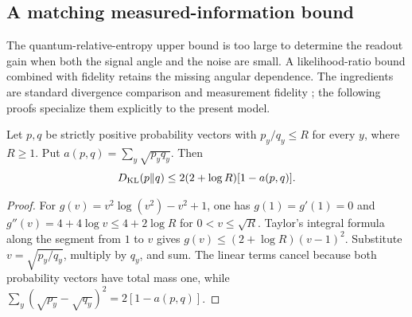 \subsection{A matching measured-information bound}
\label{sec:joint-frontier}
The quantum-relative-entropy upper bound is too large to determine the
readout gain when both the signal angle and the noise are small. A
likelihood-ratio bound combined with fidelity retains the missing angular
dependence. The ingredients are standard divergence comparison and
measurement fidelity \citep{sason2016,fuchs1995}; the following proofs
specialize them explicitly to the present model.

\begin{lemma}
\label{lem:kl-affinity}
Let $p,q$ be strictly positive probability vectors with $p_y/q_y\leq R$
for every $y$, where $R\geq1$. Put $a(p,q)=\sum_y\sqrt{p_yq_y}$. Then
\begin{equation}\label{eq:kl-affinity}
 D_{\rm KL}(p\|q)\leq2(2+\log R)[1-a(p,q)].
\end{equation}
\end{lemma}
\begin{proof}
For $g(v)=v^2\log(v^2)-v^2+1$, one has $g(1)=g'(1)=0$ and
$g''(v)=4+4\log v\leq4+2\log R$ for $0<v\leq\sqrt R$.
Taylor's integral formula along the segment from $1$ to $v$ gives
$g(v)\leq(2+\log R)(v-1)^2$. Substitute
$v=\sqrt{p_y/q_y}$, multiply by $q_y$, and sum. The linear terms
cancel because both probability vectors have total mass one, while
$\sum_y(\sqrt{p_y}-\sqrt{q_y})^2=2[1-a(p,q)]$.
\end{proof}

